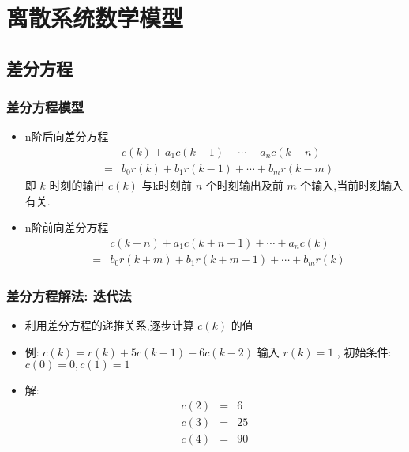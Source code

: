 \documentclass[table]{beamer}
\begin{document}
\section{离散系统数学模型}
\label{sec-4}
\subsection{差分方程}
\label{sec-4-1}
\begin{frame}
\frametitle{差分方程模型}
\label{sec-4-1-1}

\begin{itemize}
\item <2->n阶后向差分方程
      \begin{eqnarray*}
       & &c(k)+a_1 c(k-1)+\cdots+a_n c(k-n) \\
       &=& b_0 r(k) +b_1 r(k-1) + \cdots + b_m r(k-m)
      \end{eqnarray*}
      即  $k$  时刻的输出  $c(k)$  与k时刻前  $n$  个时刻输出及前  $m$  个输入,当前时刻输入有关.
\item <3->n阶前向差分方程
      \begin{eqnarray*}
    & &  c(k+n)+a_1 c(k+n-1)+\cdots+a_n c(k) \\
    &=& b_0 r(k+m)+b_1 r(k+m-1)+\cdots+ b_m r(k)
      \end{eqnarray*}
\end{itemize}
\end{frame}
\begin{frame}
\frametitle{差分方程解法: 迭代法}
\label{sec-4-1-2}

\begin{itemize}
\item 利用差分方程的递推关系,逐步计算  $c(k)$  的值
\item <2->例:  $c(k)=r(k)+5 c(k-1) -6 c(k-2)$  输入  $r(k)=1$ , 初始条件:  $c(0)=0,c(1)=1$
\item <3->解:
      \begin{eqnarray*}
      c(2) & = & 6\\
      c(3) & =& 25 \\
      c(4) &=& 90
      \end{eqnarray*}
\end{itemize}
\end{frame}
\end{document}

